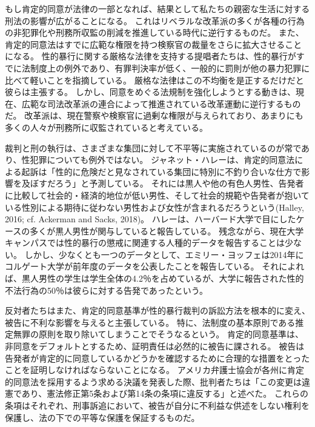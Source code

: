 \documentclass[paper=a4,book,openany]{jlreq}
\newcommand{\ig}[1]{}           %
\begin{document}
もし肯定的同意が法律の一部となれば、結果として私たちの親密な生活に対する刑法の影響が広がることになる。
これはリベラルな改革派の多くが各種の行為の非犯罪化や刑務所収監の削減を推進している時代に逆行するものだ。
また、肯定的同意法はすでに広範な権限を持つ検察官の裁量をさらに拡大させることになる。
性的暴行に関する厳格な法律を支持する提唱者たちは、性的暴行がすでに法制度上の例外であり、有罪判決率が低く、一般的に罰則が他の暴力犯罪に比べて軽いことを指摘している。
厳格な法律はこの不均衡を是正するだけだと彼らは主張する。
しかし、同意をめぐる法規制を強化しようとする動きは、現在、広範な司法改革派の連合によって推進されている改革運動に逆行するものだ。
改革派は、現在警察や検察官に過剰な権限が与えられており、あまりにも多くの人々が刑務所に収監されていると考えている。

裁判と刑の執行は、さまざまな集団に対して不平等に実施されているのが常であり、性犯罪についても例外ではない。
ジャネット・ハレー\ig{Janet Halley}は、肯定的同意法による起訴は「性的に危険だと見なされている集団に特別に不釣り合いな仕方で影響を及ぼすだろう」と予測している。
それには黒人や他の有色人男性、告発者に比較して社会的・経済的地位が低い男性、そして社会的規範や告発者が抱いている性別による期待に従わない男性および女性が含まれるだろうという(Halley, 2016; cf. Ackerman and Sacks, 2018)\nocite{ackerman18:_dispr_minor_presen_u}。
ハレーは、ハーバード大学で目にしたケースの多くが黒人男性が関与していると報告している\citep[cf.][]{halley15:_tradin_megap_gavel_title_ix_enfor}。
残念ながら、現在大学キャンパスでは性的暴行の懲戒に関連する人種的データを報告することは少ない。
しかし、少なくとも一つのデータとして、エミリー・ヨッフェ\ig{Emily Yoffe}は2014年にコルゲート大学が前年度のデータを公表したことを報告している。
それによれば、黒人男性の学生は学生全体の4.2％を占めているが、大学に報告された性的不法行為の50％は彼らに対する告発であったという\citep{yoffe17:_quest_race_campus_sexual_assaul_cases}。

反対者たちはまた、肯定的同意基準が性的暴行裁判の訴訟方法を根本的に変え、被告に不利な影響を与えると主張している。
特に、法制度の基本原則である推定無罪の原則を取り除いてしまうことでそうなるという。
肯定的同意基準は、非同意をデフォルトとするため、証明責任は必然的に被告に課される。
被告は告発者が肯定的に同意しているかどうかを確認するために合理的な措置をとったことを証明しなければならないことになる。
アメリカ弁護士協会が各州に肯定的同意法を採用するよう求める決議を発表した際、批判者たちは「この変更は違憲であり、憲法修正第5条および第14条の条項に違反する」と述べた。
これらの条項はそれぞれ、刑事訴追において、被告が自分に不利益な供述をしない権利を保護し、法の下での平等な保護を保証するものだ\citep{bauer-wolf19:_lawyer_group_disag_colleg_model_affir_consen}。
\end{document}
